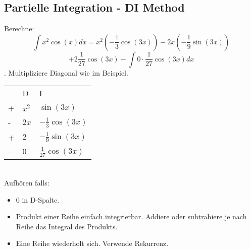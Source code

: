 \documentclass[a4paper,10pt]{article}
\begin{document}
\subsection{Partielle Integration - DI Method}
Berechne:
$$\int x^2 \cos(x) dx = x^2 (-\frac{1}{3}\cos(3x)) - 2x(-\frac{1}{9}\sin(3x))$$
$$ + 2\frac{1}{27}\cos(3x) - \int 0 \cdot \frac{1}{27} \cos(3x) dx$$.
Multipliziere Diagonal wie im Beispiel.
\begin{table}[h]
  \begin{tabular}{lll}
    & D & I \\
  + & $x^2$ & $\sin(3x)$  \\
  - & $2x$ & $-\frac{1}{3}\cos(3x)$  \\
  + & $2$ & $-\frac{1}{9}\sin(3x)$  \\
  - & $0$ & $\frac{1}{27}\cos(3x)$  
  \end{tabular}
\end{table}\\
Aufhören falls:
\begin{itemize}
  \item $0$ in D-Spalte.
  \item Produkt einer Reihe einfach integrierbar. Addiere oder subtrahiere je nach Reihe das Integral des Produkts.
  \item Eine Reihe wiederholt sich. Verwende Rekurrenz.
\end{itemize}
\end{document}
